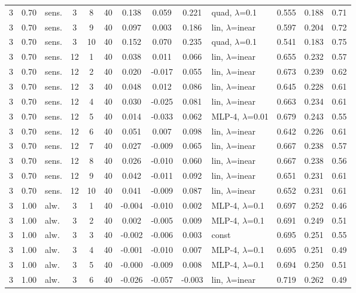 \documentclass[10pt]{article}
\begin{document}
\begin{scriptsize}
\begin{longtable}{cclcc c ccc l ccc}
3 & 0.70 & sens. & 3 & 8 & 40 & 0.138 & 0.059 & 0.221 & quad, $\lambda$=0.1 & 0.555 & 0.188 & 0.71 \\
3 & 0.70 & sens. & 3 & 9 & 40 & 0.097 & 0.003 & 0.186 & lin, $\lambda$=inear & 0.597 & 0.204 & 0.72 \\
3 & 0.70 & sens. & 3 & 10 & 40 & 0.152 & 0.070 & 0.235 & quad, $\lambda$=0.1 & 0.541 & 0.183 & 0.75 \\
3 & 0.70 & sens. & 12 & 1 & 40 & 0.038 & 0.011 & 0.066 & lin, $\lambda$=inear & 0.655 & 0.232 & 0.57 \\
3 & 0.70 & sens. & 12 & 2 & 40 & 0.020 & -0.017 & 0.055 & lin, $\lambda$=inear & 0.673 & 0.239 & 0.62 \\
3 & 0.70 & sens. & 12 & 3 & 40 & 0.048 & 0.012 & 0.086 & lin, $\lambda$=inear & 0.645 & 0.228 & 0.61 \\
3 & 0.70 & sens. & 12 & 4 & 40 & 0.030 & -0.025 & 0.081 & lin, $\lambda$=inear & 0.663 & 0.234 & 0.61 \\
3 & 0.70 & sens. & 12 & 5 & 40 & 0.014 & -0.033 & 0.062 & MLP-4, $\lambda$=0.01 & 0.679 & 0.243 & 0.55 \\
3 & 0.70 & sens. & 12 & 6 & 40 & 0.051 & 0.007 & 0.098 & lin, $\lambda$=inear & 0.642 & 0.226 & 0.61 \\
3 & 0.70 & sens. & 12 & 7 & 40 & 0.027 & -0.009 & 0.065 & lin, $\lambda$=inear & 0.667 & 0.238 & 0.57 \\
3 & 0.70 & sens. & 12 & 8 & 40 & 0.026 & -0.010 & 0.060 & lin, $\lambda$=inear & 0.667 & 0.238 & 0.56 \\
3 & 0.70 & sens. & 12 & 9 & 40 & 0.042 & -0.011 & 0.092 & lin, $\lambda$=inear & 0.651 & 0.231 & 0.61 \\
3 & 0.70 & sens. & 12 & 10 & 40 & 0.041 & -0.009 & 0.087 & lin, $\lambda$=inear & 0.652 & 0.231 & 0.61 \\
3 & 1.00 & alw. & 3 & 1 & 40 & -0.004 & -0.010 & 0.002 & MLP-4, $\lambda$=0.1 & 0.697 & 0.252 & 0.46 \\
3 & 1.00 & alw. & 3 & 2 & 40 & 0.002 & -0.005 & 0.009 & MLP-4, $\lambda$=0.1 & 0.691 & 0.249 & 0.51 \\
3 & 1.00 & alw. & 3 & 3 & 40 & -0.002 & -0.006 & 0.003 & const & 0.695 & 0.251 & 0.55 \\
3 & 1.00 & alw. & 3 & 4 & 40 & -0.001 & -0.010 & 0.007 & MLP-4, $\lambda$=0.1 & 0.695 & 0.251 & 0.49 \\
3 & 1.00 & alw. & 3 & 5 & 40 & -0.000 & -0.009 & 0.008 & MLP-4, $\lambda$=0.1 & 0.694 & 0.250 & 0.51 \\
3 & 1.00 & alw. & 3 & 6 & 40 & -0.026 & -0.057 & -0.003 & lin, $\lambda$=inear & 0.719 & 0.262 & 0.49 \\

\end{longtable}
\end{scriptsize}
\end{document}
